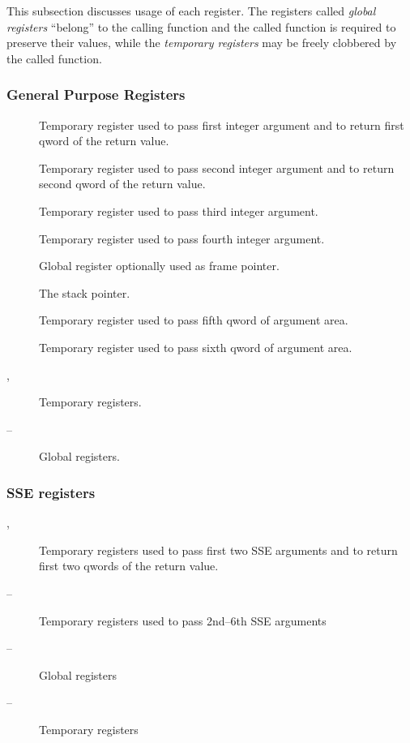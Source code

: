 This subsection discusses usage of each register.  The registers called
\emph{global registers} ``belong'' to the calling function and the called function
is required to preserve their values, while the \emph{temporary registers} may
be freely clobbered by the called function.

\subsubsection {General Purpose Registers}
\begin{description}
\item [\RAX]
Temporary register used to pass first integer argument and to return
first qword of the return value.
\item [\RDX]
Temporary register used to pass second integer argument
and to return second qword of the return value.
\item [\RCX] Temporary register used to pass third integer argument.
\item [\RBX] Temporary register used to pass fourth integer argument.
\item [\RBP] Global register optionally used as frame pointer.
\item [\RSP] The stack pointer.
\item [\RSI]
Temporary register used to pass fifth qword of argument area.
\item [\RDI] 
Temporary register used to pass sixth qword of argument area.
\item [, ] Temporary registers.
\item [ -- ] Global registers.
\end{description}


\subsubsection {SSE registers}
\begin{description}
\item [, ] Temporary registers used to pass first two SSE arguments
  and to return first two qwords of the return value.
\item [ -- ] Temporary registers used to pass 2nd--6th SSE arguments
\item [ -- ] Global registers
\item [ -- ] Temporary registers
\end{description}


